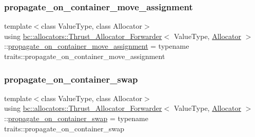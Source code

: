 \subsubsection{\texorpdfstring{propagate\+\_\+on\+\_\+container\+\_\+move\+\_\+assignment}{propagate\_on\_container\_move\_assignment}}
{\footnotesize\ttfamily template$<$class Value\+Type, class Allocator$>$ \\
using \hyperlink{structbc_1_1allocators_1_1Thrust__Allocator__Forwarder}{bc\+::allocators\+::\+Thrust\+\_\+\+Allocator\+\_\+\+Forwarder}$<$ Value\+Type, \hyperlink{classbc_1_1allocators_1_1Allocator}{Allocator} $>$\+::\hyperlink{structbc_1_1allocators_1_1Thrust__Allocator__Forwarder_afde660784fc764a5b030a862a4d7dc45}{propagate\+\_\+on\+\_\+container\+\_\+move\+\_\+assignment} =  typename traits\+::propagate\+\_\+on\+\_\+container\+\_\+move\+\_\+assignment}

\mbox{\label{structbc_1_1allocators_1_1Thrust__Allocator__Forwarder_a9c6afa39633de336f2aab1cb8dcd06bb}} 
\subsubsection{\texorpdfstring{propagate\+\_\+on\+\_\+container\+\_\+swap}{propagate\_on\_container\_swap}}
{\footnotesize\ttfamily template$<$class Value\+Type, class Allocator$>$ \\
using \hyperlink{structbc_1_1allocators_1_1Thrust__Allocator__Forwarder}{bc\+::allocators\+::\+Thrust\+\_\+\+Allocator\+\_\+\+Forwarder}$<$ Value\+Type, \hyperlink{classbc_1_1allocators_1_1Allocator}{Allocator} $>$\+::\hyperlink{structbc_1_1allocators_1_1Thrust__Allocator__Forwarder_a9c6afa39633de336f2aab1cb8dcd06bb}{propagate\+\_\+on\+\_\+container\+\_\+swap} =  typename traits\+::propagate\+\_\+on\+\_\+container\+\_\+swap}

\mbox{\label{structbc_1_1allocators_1_1Thrust__Allocator__Forwarder_abc8c9530854de1017446433e27ef8ae1}} 
